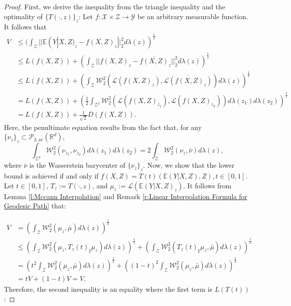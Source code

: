 \documentclass[twoside,11pt]{article}
\begin{document}
\begin{proof}
First, we derive the inequality from the triangle inequality and the optimality of $\{T(\cdot,z)\}_z$: Let $f: \mathcal{X} \times \mathcal{Z} \rightarrow \mathcal{Y}$ be an arbitrary measurable function. It follows that
\begin{align*}
V & \leq (\int_{\mathcal{Z}} ||\mathbb{E}(Y|X,Z)_z - \overline{f(X,Z)}_z ||_2^2 d\lambda(z))^{\frac{1}{2}} \\
& \leq L(f(X,Z)) + (\int_{\mathcal{Z}} ||f(X,Z)_z - \overline{f(X,Z)}_z ||_2^2 d\lambda(z))^{\frac{1}{2}}\\
& \leq L(f(X,Z)) + (\int_{\mathcal{Z}} \mathcal{W}_2^2( \mathcal{L}(f(X,Z)_z) ,\overline{\mathcal{L}(f(X,Z)_z)}) d\lambda(z))^{\frac{1}{2}}\\
& = L(f(X,Z)) + (\frac{1}{2} \int_{\mathcal{Z}^2} \mathcal{W}_2^2 (\mathcal{L}(f(X,Z)_{z_1}),\mathcal{L}(f(X,Z)_{z_2})) d\lambda(z_1)d\lambda(z_2))^{\frac{1}{2}}\\
& = L(f(X,Z)) + \frac{1}{\sqrt{2}} D(f(X,Z)).
\end{align*}
Here, the penultimate equation results from the fact that, for any $\{\nu_z\}_z \subset \mathcal{P}_{2,ac}(\mathbb{R}^d)$,
\begin{equation}
\int_{\mathcal{Z}^2} \mathcal{W}_2^2(\nu_{z_1},\nu_{z_2}) d\lambda(z_1)d\lambda(z_2) = 2 \int_{\mathcal{Z}} \mathcal{W}_2^2(\nu_{z},\bar{\nu}) d\lambda(z),
\end{equation}
where $\bar{\nu}$ is the Wasserstein barycenter of $\{\nu_z\}_z$.  Now, we show that the lower bound is achieved if and only if $f(X,Z) = T(t)(\mathbb{E}(Y|X,Z),Z), t \in [0,1]$. Let $ t \in [0,1]$, $T_z := T(\cdot,z)$, and $\mu_z :=  \mathcal{L}(\mathbb{E}(Y|X,Z)_z)$. It follows from Lemma \ref{l:Mccann Interpolation} and Remark \ref{r:Linear Interpolation Formula for Geodesic Path} that:

\begin{align*}
V & = (\int_{\mathcal{Z}} \mathcal{W}_2^2(\mu_z,\bar{\mu}) d\lambda(z))^{\frac{1}{2}}\\
& \leq (\int_{\mathcal{Z}} \mathcal{W}_2^2(\mu_z,T_z(t)_{\sharp}\mu_z) d\lambda(z))^{\frac{1}{2}} + (\int_{\mathcal{Z}} \mathcal{W}_2^2(T_z(t)_{\sharp}\mu_z,\bar{\mu}) d\lambda(z))^{\frac{1}{2}}\\
& = (t^2\int_{\mathcal{Z}} \mathcal{W}_2^2(\mu_z,\bar{\mu}) d\lambda(z))^{\frac{1}{2}} + ((1-t)^2\int_{\mathcal{Z}} \mathcal{W}_2^2(\mu_z,\bar{\mu}) d\lambda(z))^{\frac{1}{2}}\\
& = tV + (1-t)V = V.
\end{align*}
Therefore, the second inequality is an equality where the first term is $L(T(t))$:


\end{proof}
\end{document}
